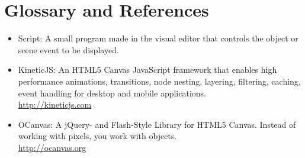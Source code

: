 \documentclass[12pt]{article}
\begin{document}
\section{Glossary and References}

\begin{itemize}
\item Script:  A small program made in the visual editor that controls the object or scene event to be displayed.
\item KineticJS:  An HTML5 Canvas JavaScript framework that enables high performance animations, transitions, node nesting, layering, filtering, caching, event handling for desktop and mobile applications. \\
\url{http://kineticjs.com}
\item OCanvas:  A jQuery- and Flash-Style Library for HTML5 Canvas.  Instead of working with pixels, you work with objects. \\
\url{http://ocanvas.org}
\end{itemize}
\end{document}
